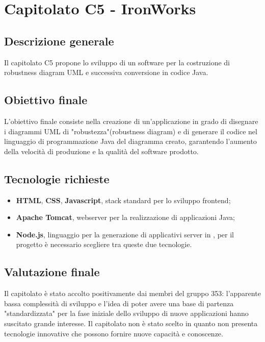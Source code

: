 \documentclass[StudioDiFattibilità.tex]{subfiles}
\begin{document}
\chapter{Capitolato C5 - IronWorks}
\section{Descrizione generale}
Il capitolato C5 propone lo sviluppo di un software
per la costruzione di robustness diagram UML e successiva conversione in codice Java.
\section{Obiettivo finale}
L'obiettivo finale consiste nella creazione di un'applicazione in grado di disegnare i diagrammi UML di "robustezza"(robustness diagram) e di generare il codice nel linguaggio di programmazione Java del diagramma creato, garantendo l'aumento della velocità di produzione e la qualità del software prodotto.
\section{Tecnologie richieste}
\begin{itemize}
	\item \textbf{HTML}, \textbf{CSS}, \textbf{Javascript}, stack standard per lo sviluppo frontend;
	\item \textbf{Apache Tomcat}, webserver per la realizzazione di applicazioni Java;
	\item \textbf{Node.js}, linguaggio per la generazione di applicativi server in , per il progetto è necessario scegliere tra queste due tecnologie.
\end{itemize}
\section{Valutazione finale}
Il capitolato è stato accolto positivamente dai membri del gruppo 353: l'apparente bassa complessità di sviluppo e l'idea di poter avere una base di partenza "standardizzata" per la fase iniziale dello sviluppo di nuove applicazioni hanno suscitato grande interesse. Il capitolato non è stato scelto in quanto non presenta tecnologie innovative che possono fornire nuove capacità e conoscenze.
\end{document}
